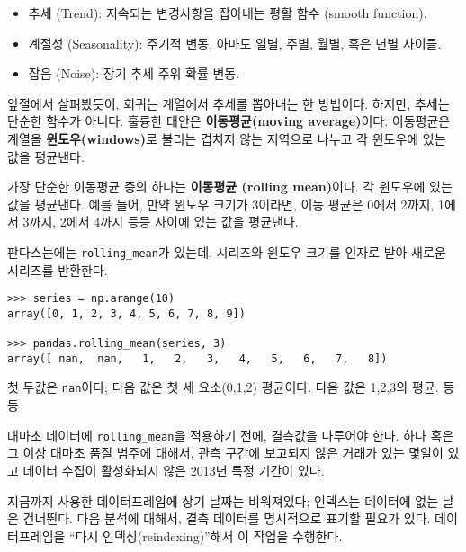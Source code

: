\begin{itemize}

\item 추세 (Trend): 지속되는 변경사항을 잡아내는 평활 함수 (smooth function).

\item 계절성 (Seasonality): 주기적 변동, 아마도 일별, 주별, 월별, 혹은 년별 사이클.

\item 잡음 (Noise): 장기 추세 주위 확률 변동.

\end{itemize}

앞절에서 살펴봤듯이, 회귀는 계열에서 추세를 뽑아내는 한 방법이다. 하지만, 추세는 단순한 함수가 아니다. 훌륭한 대안은 {\bf 이동평균(moving average)}이다. 이동평균은 계열을 {\bf 윈도우(windows)}로 불리는 겹치지 않는 지역으로 나누고 각 윈도우에 있는 값을 평균낸다.

가장 단순한 이동평균 중의 하나는 {\bf 이동평균 (rolling mean)}이다. 각 윈도우에 있는 값을 평균낸다. 예를 들어, 만약 윈도우 크기가 3이라면, 이동 평균은 0에서 2까지, 1에서 3까지, 2에서 4까지 등등 사이에 있는 값을 평균낸다.


판다스는에는 \verb"rolling_mean"가 있는데, 시리즈와 윈도우 크기를 인자로 받아 새로운 시리즈를 반환한다.

\begin{verbatim}
>>> series = np.arange(10)
array([0, 1, 2, 3, 4, 5, 6, 7, 8, 9])

>>> pandas.rolling_mean(series, 3)
array([ nan,  nan,   1,   2,   3,   4,   5,   6,   7,   8])
\end{verbatim}

첫 두값은 {\tt nan}이다; 다음 값은 첫 세 요소(0,1,2) 평균이다.
다음 값은 1,2,3의 평균. 등등

대마초 데이터에 \verb"rolling_mean"을 적용하기 전에, 결측값을 다루어야 한다. 하나 혹은 그 이상 대마초 품질 범주에 대해서, 관측 구간에 보고되지 않은 거래가 있는 몇일이 있고 데이터 수집이 활성화되지 않은 2013년 특정 기간이 있다.


지금까지 사용한 데이터프레임에 상기 날짜는 비워져있다; 인덱스는 데이터에 없는 날은 건너뛴다. 다음 분석에 대해서, 결측 데이터를 명시적으로 표기할 필요가 있다. 데이터프레임을 ``다시 인덱싱(reindexing)''해서 이 작업을 수행한다.


